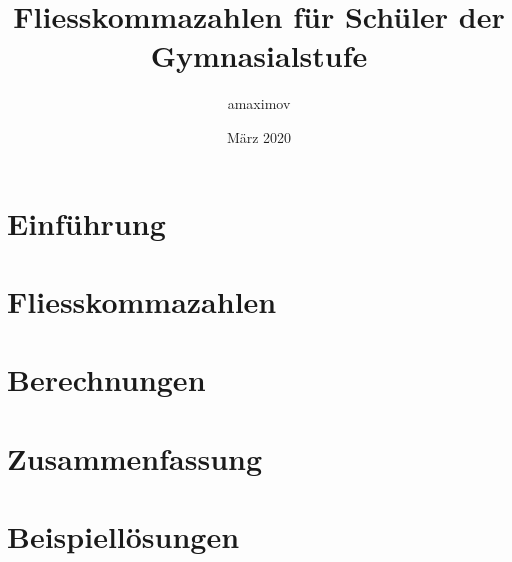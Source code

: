 \documentclass{article}
\title{Fliesskommazahlen für Schüler der Gymnasialstufe}
\author{amaximov}
\date{März 2020}
\begin{document}
\maketitle

\tableofcontents

\section{Einführung}

\newpage

\section{Fliesskommazahlen}

\newpage

\section{Berechnungen}

\newpage

\section{Zusammenfassung}

\newpage

\nocite{*}


\newpage

\section{Beispiellösungen}
\end{document}
